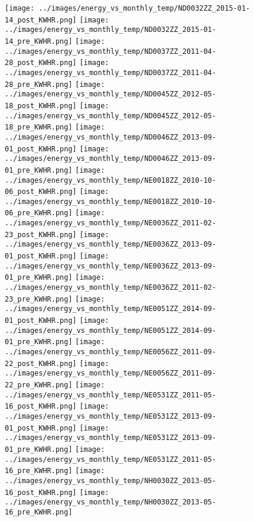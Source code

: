 \clearpage
\begin{figure}
\centering
\texttt{[image: ../images/energy\_vs\_monthly\_temp/ND0032ZZ\_2015-01-14\_post\_KWHR.png]}
\texttt{[image: ../images/energy\_vs\_monthly\_temp/ND0032ZZ\_2015-01-14\_pre\_KWHR.png]}
\texttt{[image: ../images/energy\_vs\_monthly\_temp/ND0037ZZ\_2011-04-28\_post\_KWHR.png]}
\texttt{[image: ../images/energy\_vs\_monthly\_temp/ND0037ZZ\_2011-04-28\_pre\_KWHR.png]}
\texttt{[image: ../images/energy\_vs\_monthly\_temp/ND0045ZZ\_2012-05-18\_post\_KWHR.png]}
\texttt{[image: ../images/energy\_vs\_monthly\_temp/ND0045ZZ\_2012-05-18\_pre\_KWHR.png]}
\texttt{[image: ../images/energy\_vs\_monthly\_temp/ND0046ZZ\_2013-09-01\_post\_KWHR.png]}
\texttt{[image: ../images/energy\_vs\_monthly\_temp/ND0046ZZ\_2013-09-01\_pre\_KWHR.png]}
\texttt{[image: ../images/energy\_vs\_monthly\_temp/NE0018ZZ\_2010-10-06\_post\_KWHR.png]}
\texttt{[image: ../images/energy\_vs\_monthly\_temp/NE0018ZZ\_2010-10-06\_pre\_KWHR.png]}
\texttt{[image: ../images/energy\_vs\_monthly\_temp/NE0036ZZ\_2011-02-23\_post\_KWHR.png]}
\texttt{[image: ../images/energy\_vs\_monthly\_temp/NE0036ZZ\_2013-09-01\_post\_KWHR.png]}
\texttt{[image: ../images/energy\_vs\_monthly\_temp/NE0036ZZ\_2013-09-01\_pre\_KWHR.png]}
\texttt{[image: ../images/energy\_vs\_monthly\_temp/NE0036ZZ\_2011-02-23\_pre\_KWHR.png]}
\texttt{[image: ../images/energy\_vs\_monthly\_temp/NE0051ZZ\_2014-09-01\_post\_KWHR.png]}
\texttt{[image: ../images/energy\_vs\_monthly\_temp/NE0051ZZ\_2014-09-01\_pre\_KWHR.png]}
\texttt{[image: ../images/energy\_vs\_monthly\_temp/NE0056ZZ\_2011-09-22\_post\_KWHR.png]}
\texttt{[image: ../images/energy\_vs\_monthly\_temp/NE0056ZZ\_2011-09-22\_pre\_KWHR.png]}
\texttt{[image: ../images/energy\_vs\_monthly\_temp/NE0531ZZ\_2011-05-16\_post\_KWHR.png]}
\texttt{[image: ../images/energy\_vs\_monthly\_temp/NE0531ZZ\_2013-09-01\_post\_KWHR.png]}
\texttt{[image: ../images/energy\_vs\_monthly\_temp/NE0531ZZ\_2013-09-01\_pre\_KWHR.png]}
\texttt{[image: ../images/energy\_vs\_monthly\_temp/NE0531ZZ\_2011-05-16\_pre\_KWHR.png]}
\texttt{[image: ../images/energy\_vs\_monthly\_temp/NH0030ZZ\_2013-05-16\_post\_KWHR.png]}
\texttt{[image: ../images/energy\_vs\_monthly\_temp/NH0030ZZ\_2013-05-16\_pre\_KWHR.png]}
\end{figure}
